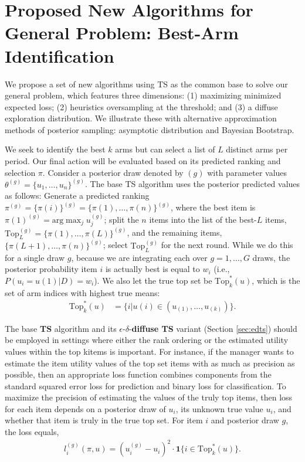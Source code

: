 \documentclass[nonblindrev]{informs3}
\newcommand{\ts}{\textbf{TS} }
\newcommand{\edts}{$\epsilon$-$\delta$-\textbf{diffuse TS} }
\newcommand{\numitems}{n}
\newcommand{\numtopset}{k}
\newcommand{\topset}{\text{Top}_k}
\begin{document}
\section{Proposed New Algorithms for General Problem: Best-Arm Identification} 

We propose a set of new algorithms using TS as the common base to solve our general problem, which features three dimensions: (1) maximizing minimized expected loss; (2) heuristics oversampling at the threshold; and (3) a diffuse exploration distribution. We illustrate these with alternative approximation methods of posterior sampling: asymptotic distribution and Bayesian Bootstrap.

We seek to identify the best $k$ arms but can select a list of $L$ distinct arms per period. Our final action will be evaluated based on its predicted ranking and selection $\pi$. Consider a posterior draw denoted by $(g)$ with parameter values $\theta^{(g)} = \{u_1,\ldots,u_\numitems\}^{(g)}$. The base TS algorithm uses the posterior predicted values as follows: Generate a predicted ranking $\pi^{(g)} = \{\pi(i)\}^{(g)} = \{ \pi(1),\ldots,\pi(\numitems) \}^{(g)}$, where the best item is $\pi(1)^{(g)} = \text{arg}\max_{j} u_j^{(g)}$; split the $\numitems$ items into the list of the best-$L$ items, $\text{Top}_L^{(g)}=\{ \pi(1), \ldots,\pi(L) \}^{(g)}$, and the remaining items, $\{ \pi(L+1), \ldots,\pi(\numitems) \}^{(g)}$; select $\text{Top}_L^{(g)}$ for the next round. While we do this for a single draw $g$, because we are integrating each over $g=1,\ldots,G$ draws, the posterior probability item $i$ is actually best is equal to $w_i$ (i.e., $P( u_i = u(1) | D ) = w_i$). We also let the true top set be $\topset^{*}(u)$, which is the set of arm indices with highest true means:
\begin{align}
\topset^{*}(u) &= \{i | u(i) \in ( u_{(1)},\ldots,u_{(\numtopset)} ) \} .
\end{align}

The base \ts algorithm and its \edts variant (Section \ref{sec:edts}) should be employed in settings where either the rank ordering or the estimated utility values within the top \numtopset items is important. For instance, if the manager wants to estimate the item utility values of the top set items with as much as precision as possible, then an appropriate loss function combines components from the standard squared error loss for prediction and binary loss for classification. To maximize the precision of estimating the values of the truly top items, then loss for each item depends on a posterior draw of $u_i$, its unknown true value $u_i$, and whether that item is truly in the true top set. For item $i$ and posterior draw $g$, the loss equals,
\begin{align}
l_i^{(g)}(\pi,u) = ( u_i^{(g)} - u_i )^2 \cdot \mathbf{1}\{ i \in \topset^{*}(u) \}.
\end{align}
\end{document}
